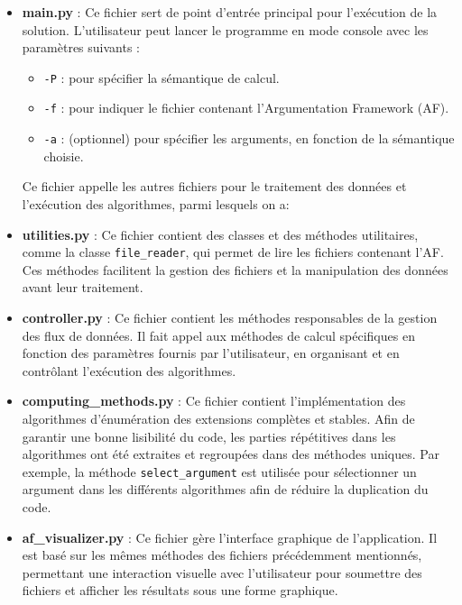 \documentclass{rapportECL}
\begin{document}
\begin{itemize}
    \item \textbf{main.py} : Ce fichier sert de point d'entrée principal pour l'exécution de la solution. L'utilisateur peut lancer le programme en mode console avec les paramètres suivants :
    \begin{itemize}
        \item \texttt{-P} : pour spécifier la sémantique de calcul.
        \item \texttt{-f} : pour indiquer le fichier contenant l'Argumentation Framework (AF).
        \item \texttt{-a} : (optionnel) pour spécifier les arguments, en fonction de la sémantique choisie.
    \end{itemize}
    Ce fichier appelle les autres fichiers pour le traitement des données et l'exécution des algorithmes, parmi lesquels on a:

    \item \textbf{utilities.py} : Ce fichier contient des classes et des méthodes utilitaires, comme la classe \texttt{file\_reader}, qui permet de lire les fichiers contenant l'AF. Ces méthodes facilitent la gestion des fichiers et la manipulation des données avant leur traitement.

    \item \textbf{controller.py} : Ce fichier contient les méthodes responsables de la gestion des flux de données. Il fait appel aux méthodes de calcul spécifiques en fonction des paramètres fournis par l'utilisateur, en organisant et en contrôlant l'exécution des algorithmes.

    \item \textbf{computing\_methods.py} : Ce fichier contient l'implémentation des algorithmes d'énumération des extensions complètes et stables. Afin de garantir une bonne lisibilité du code, les parties répétitives dans les algorithmes ont été extraites et regroupées dans des méthodes uniques. Par exemple, la méthode \texttt{select\_argument} est utilisée pour sélectionner un argument dans les différents algorithmes afin de réduire la duplication du code.

    \item \textbf{af\_visualizer.py} : Ce fichier gère l'interface graphique de l'application. Il est basé sur les mêmes méthodes des fichiers précédemment mentionnés, permettant une interaction visuelle avec l'utilisateur pour soumettre des fichiers et afficher les résultats sous une forme graphique.
\end{itemize}
\end{document}
